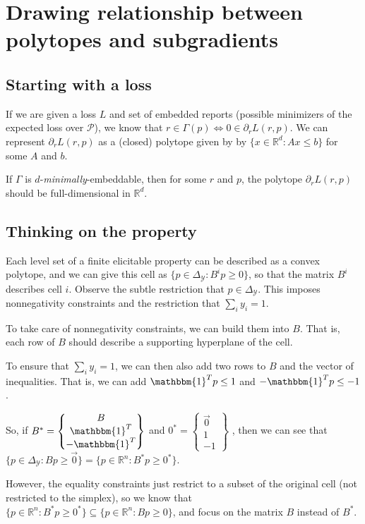 \documentclass[12pt]{article}
\newcommand{\reals}{\mathbb{R}}
\renewcommand{\P}{\mathcal{P}}
\newcommand{\Y}{\mathcal{Y}}
\newcommand{\ones}{\mathbbm{1}}
\newcommand{\simplex}{\Delta_\Y}
\begin{document}
\section{Drawing relationship between polytopes and subgradients}
\subsection{Starting with a loss}
If we are given a loss $L$ and set of embedded reports (possible minimizers of the expected loss over $\P$), we know that $r \in \Gamma(p) \iff 0 \in \partial_r L(r, p)$.
We can represent $\partial_r L(r,p)$ as a (closed) polytope given by by $\{x \in \reals^d : Ax \leq b \}$ for some $A$ and $b$.

If $\Gamma$ is $d$-\emph{minimally}-embeddable, then for some $r$ and $p$, the polytope $\partial_r L(r,p)$ should be full-dimensional in $\reals^d$.

\subsection{Thinking on the property}
Each level set of a finite elicitable property can be described as a convex polytope, and we can give this cell as $\{p \in \simplex : B^ip \geq 0 \}$, so that the matrix $B^i$ describes cell $i$.
Observe the subtle restriction that $p \in \simplex$.
This imposes nonnegativity constraints and the restriction that $\sum_i y_i =1$.

To take care of nonnegativity constraints, we can build them into $B$.
That is, each row of $B$ should describe a supporting hyperplane of the cell.

To ensure that $\sum_i y_i = 1$, we can then also add two rows to $B$ and the vector of inequalities.
That is, we can add $\ones^T p \leq 1$ and $-\ones^T p \leq -1$.

So, if $B^* = \begin{Bmatrix}
B \\
\ones^T \\
-\ones^T
\end{Bmatrix}$ 
and $0^* = \begin{Bmatrix}
\vec{0}\\
1\\
-1
\end{Bmatrix}$
, then we can see that $\{p \in \simplex: Bp \geq \vec{0} \} = \{p \in \reals^n : B^* p \geq 0^*\}$.

However, the equality constraints just restrict to a subset of the original cell (not restricted to the simplex), so we know that $\{p \in \reals^n : B^* p \geq 0^*\} \subseteq \{p \in \reals^n : B p \geq 0\}$, and focus on the matrix $B$ instead of $B^*$.
\end{document}
